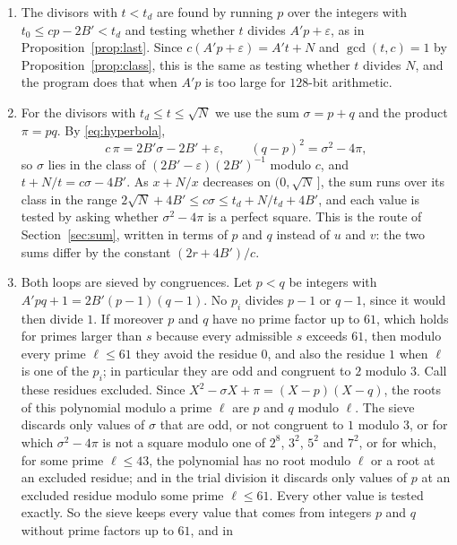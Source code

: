 \documentclass[11pt,reqno]{amsart}
\numberwithin{equation}{section}
\theoremstyle{plain}
\theoremstyle{definition}
\theoremstyle{remark}
\begin{document}
\begin{enumerate}[label=\textup{(\roman*)}, leftmargin=*]
\item The divisors with $t<t_d$ are found by running $p$ over the
  integers with $t_0\le cp-2B'<t_d$ and testing whether $t$ divides
  $A'p+\varepsilon$, as in Proposition~\ref{prop:last}. Since
  $c(A'p+\varepsilon)=A't+N$ and $\gcd(t,c)=1$ by
  Proposition~\ref{prop:class}, this is the same as testing whether $t$
  divides $N$, and the program does that when $A'p$ is too large for
  $128$-bit arithmetic.
\item For the divisors with $t_d\le t\le\sqrt N$ we use the sum
  $\sigma=p+q$ and the product $\pi=pq$. By \eqref{eq:hyperbola},
  \begin{equation}\label{eq:sigma}
    c\,\pi=2B'\sigma-2B'+\varepsilon,\qquad
    (q-p)^2=\sigma^2-4\pi ,
  \end{equation}
  so $\sigma$ lies in the class of $(2B'-\varepsilon)(2B')^{-1}$ modulo
  $c$, and $t+N/t=c\sigma-4B'$. As $x+N/x$ decreases on
  $(0,\sqrt N\,]$, the sum runs over its class in the range
  $2\sqrt N+4B'\le c\sigma\le t_d+N/t_d+4B'$, and each value is
  tested by asking whether $\sigma^2-4\pi$ is a perfect square. This
  is the route of Section~\ref{sec:sum}, written in terms of $p$ and
  $q$ instead of $u$ and $v$: the two sums differ by the constant
  $(2r+4B')/c$.
\item Both loops are sieved by congruences. Let $p<q$ be integers
  with $A'pq+1=2B'(p-1)(q-1)$. No $p_i$ divides $p-1$ or $q-1$, since
  it would then divide $1$. If moreover $p$ and $q$ have no prime
  factor up to $61$, which holds for primes larger than $s$ because
  every admissible $s$ exceeds $61$, then modulo every prime $\ell\le61$
  they avoid the residue $0$, and also the residue $1$ when $\ell$ is
  one of the $p_i$; in particular they are odd and congruent to $2$
  modulo $3$. Call these residues excluded. Since
  $X^2-\sigma X+\pi=(X-p)(X-q)$, the roots of this polynomial modulo a
  prime $\ell$ are $p$ and $q$ modulo $\ell$. The sieve discards only
  values of $\sigma$ that are odd, or not congruent to $1$ modulo $3$,
  or for which $\sigma^2-4\pi$ is not a square modulo one of $2^8$,
  $3^2$, $5^2$ and $7^2$, or for which, for some prime $\ell\le43$,
  the polynomial has no root modulo $\ell$ or a root at an excluded
  residue; and in the trial division it discards only values of $p$
  at an excluded residue modulo some prime $\ell\le61$. Every other
  value is tested exactly. So the sieve keeps every value that comes
  from integers $p$ and $q$ without prime factors up to $61$, and in

\end{enumerate}
\end{document}
